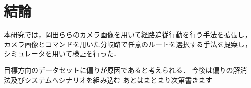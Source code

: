 \chapter{結論}

本研究では，岡田ら\cite{okada}らのカメラ画像を用いて経路追従行動を行う手法を拡張し，
カメラ画像とコマンドを用いた分岐路で任意のルートを選択する手法を提案し，シミュレータを用いて検証を行った．

目標方向のデータセットに偏りが原因であると考えられる．
今後は偏りの解消法及びシステムへシナリオを組み込む
あとはまとまり次第書きます